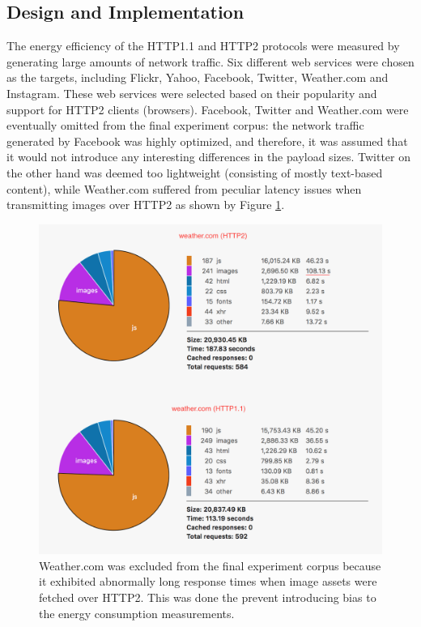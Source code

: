 \documentclass{article}
\begin{document}
\subsection{Design and Implementation}
\label{chapter:design-implementation}

The energy efficiency of the HTTP1.1 and HTTP2 protocols were measured by generating large amounts of network traffic. Six different web services were chosen as the targets, including Flickr, Yahoo, Facebook, Twitter, Weather.com and Instagram. These web services were selected based on their popularity and support for HTTP2 clients (browsers). Facebook, Twitter and Weather.com were eventually omitted from the final experiment corpus: the network traffic generated by Facebook was highly optimized, and therefore, it was assumed that it would not introduce any interesting differences in the payload sizes. Twitter on the other hand was deemed too lightweight (consisting of mostly text-based content), while Weather.com suffered from peculiar latency issues when transmitting images over HTTP2 as shown by Figure \ref{fig:weather.com}.

\begin{figure}[h!]
\centering
\includegraphics[scale=0.6]{images/weathercom.png}
\caption{Weather.com was excluded from the final experiment corpus because it exhibited abnormally long response times when image assets were fetched over HTTP2. This was done the prevent introducing bias to the energy consumption measurements.}
\label{fig:weather.com}
\end{figure}
\end{document}
